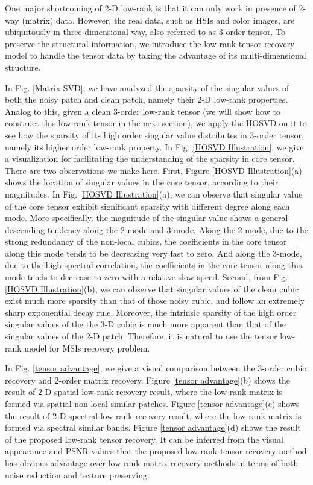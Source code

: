 \documentclass[twocolumn]{svjour3}          %
\begin{document}
    One major shortcoming of 2-D low-rank is that it can only work in presence of 2-way (matrix) data. However, the real data, such as HSIs and color images, are ubiquitously in three-dimensional way, also referred to as 3-order tensor. To preserve the structural information, we introduce the low-rank tensor recovery model to handle the tensor data by taking the advantage of its multi-dimensional structure.

    In Fig. \ref{Matrix SVD}, we have analyzed the sparsity of the singular values of both the noisy patch and clean patch, namely their 2-D low-rank properties. Analog to this, given a clean 3-order low-rank tensor (we will show how to construct this low-rank tensor in the next section), we apply the HOSVD on it to see how the sparsity of its high order singular value distributes in 3-order tensor, namely its higher order low-rank property. In Fig. \ref{HOSVD Illustration}, we give a visualization for facilitating the understanding of the sparsity in core tensor. There are two observations we make here. First, Figure \ref{HOSVD Illustration}(a) shows the location of singular values in the core tensor, according to their magnitudes. In Fig. \ref{HOSVD Illustration}(a), we can observe that singular value of the core tensor exhibit significant sparsity with different degree along each mode. More specifically, the magnitude of the singular value shows a general descending tendency along the 2-mode and 3-mode. Along the 2-mode, due to the strong redundancy of the non-local cubics, the coefficients in the core tensor along this mode tends to be decreasing very fast to zero. And along the 3-mode, due to the high spectral correlation, the coefficients in the core tensor along this mode tends to decrease to zero with a relative slow speed. Second, from Fig. \ref{HOSVD Illustration}(b), we can observe that singular values of the clean cubic exist much more sparsity than that of those noisy cubic, and follow an extremely sharp exponential decay rule. Moreover, the intrinsic sparsity of the high order singular values of the the 3-D cubic is much more apparent than that of the singular values of the 2-D patch. Therefore, it is natural to use the tensor low-rank model for MSIs recovery problem.

    In Fig. \ref{tensor advantage}, we give a visual comparison between the 3-order cubic recovery and 2-order matrix recovery. Figure \ref{tensor advantage}(b) shows the result of 2-D spatial low-rank recovery result, where the low-rank matrix is formed via spatial non-local similar patches. Figure \ref{tensor advantage}(c) shows the result of 2-D spectral low-rank recovery result, where the low-rank matrix is formed via spectral similar bands. Figure \ref{tensor advantage}(d) shows the result of the proposed low-rank tensor recovery. It can be inferred from the visual appearance and PSNR values that the proposed low-rank tensor recovery method has obvious advantage over low-rank matrix recovery methods in terms of both noise reduction and texture preserving.
\end{document}
